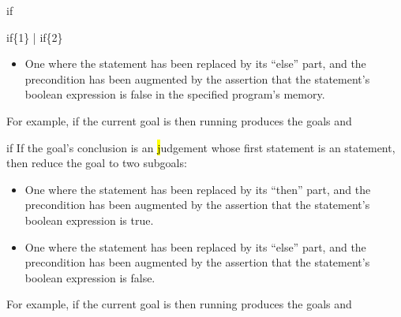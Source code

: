 \begin{tactic}{if}
\begin{tsyntax}{if\{1\} | if\{2\}}
\begin{itemize}
    \item One where the  statement has been replaced by its
      ``else'' part, and the precondition has been augmented by the
      assertion that the  statement's boolean expression is false
      in the specified program's memory.
    \end{itemize}

    For example, if the current goal is
     then running
     produces the
    goals  and
  \end{tsyntax}

  \begin{tsyntax}{if}
    If the goal's conclusion is an \hl judgement whose first statement
    is an  statement, then reduce the goal to two subgoals:
    \begin{itemize}
    \item One where the  statement has been replaced by its
      ``then'' part, and the precondition has been augmented by the
      assertion that the  statement's boolean expression is true.

    \item One where the  statement has been replaced by its
      ``else'' part, and the precondition has been augmented by the
      assertion that the  statement's boolean expression is false.
    \end{itemize}

    For example, if the current goal is
     then running
     produces the
    goals  and
  \end{tsyntax}
\end{tactic}
